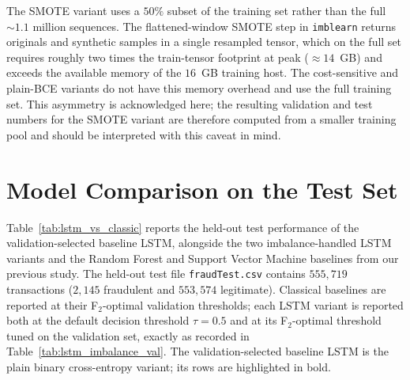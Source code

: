 \documentclass[oneside,12pt,parskip=half,american,numbers=noenddot]{scrreprt}
\begin{document}
The SMOTE variant uses a $50\%$ subset of the training set rather than the full $\sim 1.1$ million sequences. The flattened-window SMOTE step in \texttt{imblearn} returns originals and synthetic samples in a single resampled tensor, which on the full set requires roughly two times the train-tensor footprint at peak ($\approx 14$~GB) and exceeds the available memory of the $16$~GB training host. The cost-sensitive and plain-BCE variants do not have this memory overhead and use the full training set. This asymmetry is acknowledged here; the resulting validation and test numbers for the SMOTE variant are therefore computed from a smaller training pool and should be interpreted with this caveat in mind.



\section{Model Comparison on the Test Set}
\label{subsec:model_comparison}

Table~\ref{tab:lstm_vs_classic} reports the held-out test performance of the validation-selected baseline LSTM, alongside the two imbalance-handled LSTM variants and the Random Forest and Support Vector Machine baselines from our previous study. The held-out test file \texttt{fraudTest.csv} contains $555{,}719$ transactions ($2{,}145$ fraudulent and $553{,}574$ legitimate). Classical baselines are reported at their F$_2$-optimal validation thresholds; each LSTM variant is reported both at the default decision threshold $\tau = 0.5$ and at its F$_2$-optimal threshold tuned on the validation set, exactly as recorded in Table~\ref{tab:lstm_imbalance_val}. The validation-selected baseline LSTM is the plain binary cross-entropy variant; its rows are highlighted in bold.
\end{document}
